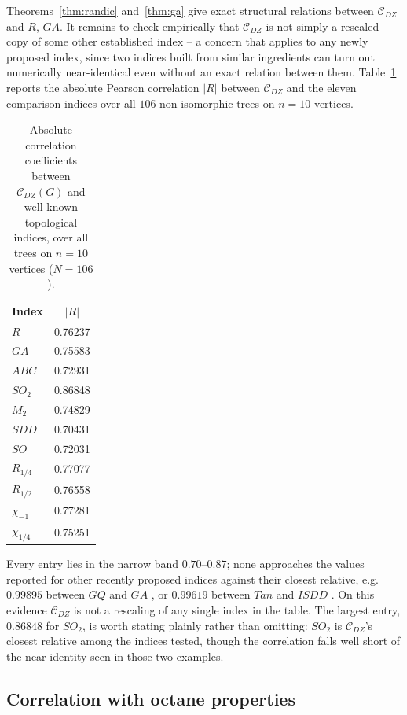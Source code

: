 \documentclass[11pt,a4paper]{article}
\theoremstyle{plain}
\theoremstyle{definition}
\theoremstyle{remark}
\newcommand{\CDZ}{\mathcal{C}_{DZ}}
\begin{document}
Theorems~\ref{thm:randic} and~\ref{thm:ga} give exact structural relations
between $\CDZ$ and $R$, $GA$. It remains to check empirically that $\CDZ$ is not
simply a rescaled copy of some other established index -- a concern that applies
to any newly proposed index, since two indices built from similar ingredients can
turn out numerically near-identical even without an exact relation between them.
Table~\ref{tab:correlation} reports the absolute Pearson correlation $|R|$
between $\CDZ$ and the eleven comparison indices over all $106$ non-isomorphic
trees on $n=10$ vertices.

\begin{table}[htbp]
\centering
\caption{Absolute correlation coefficients between $\CDZ(G)$ and well-known
topological indices, over all trees on $n=10$ vertices ($N=106$).}
\label{tab:correlation}
\begin{tabular}{lc}
\toprule
Index & $|R|$ \\
\midrule
$R$          & 0.76237 \\
$GA$         & 0.75583 \\
$ABC$        & 0.72931 \\
$SO_2$       & 0.86848 \\
$M_2$        & 0.74829 \\
$SDD$        & 0.70431 \\
$SO$         & 0.72031 \\
$R_{1/4}$    & 0.77077 \\
$R_{1/2}$    & 0.76558 \\
$\chi_{-1}$  & 0.77281 \\
$\chi_{1/4}$ & 0.75251 \\
\bottomrule
\end{tabular}
\end{table}

Every entry lies in the narrow band $0.70$--$0.87$; none approaches the values
reported for other recently proposed indices against their closest relative,
e.g.\ $0.99895$ between $GQ$ and $GA$ \cite{furtula2025ijmc}, or $0.99619$
between $Tan$ and $ISDD$ \cite{oz2025}. On this evidence $\CDZ$ is not a
rescaling of any single index in the table. The largest entry, $0.86848$ for
$SO_2$, is worth stating plainly rather than omitting: $SO_2$ is $\CDZ$'s closest
relative among the indices tested, though the correlation falls well short of the
near-identity seen in those two examples.

\subsection{Correlation with octane properties}
\label{sec:octane}
\end{document}
